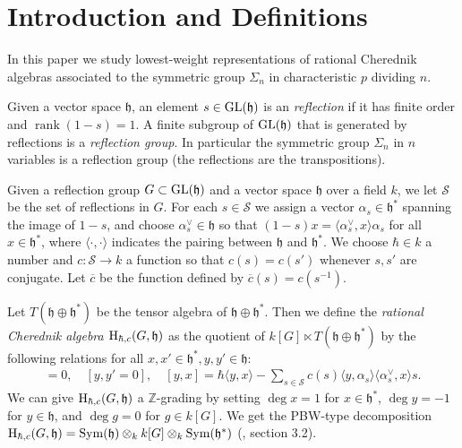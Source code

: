 \documentclass{article}
\numberwithin{equation}{section}
\newcommand{\rank}{\operatorname{rank}}
\newcommand{\h}{\mathfrak{h}}
\newcommand{\GL}{{\rm GL}}
\newcommand{\HH}{{\rm H}}
\newcommand{\Sym}{\operatorname{Sym}}
\begin{document}




\section{Introduction and Definitions}

In this paper we study lowest-weight representations of rational Cherednik algebras associated to the symmetric group $\Sigma_n$ in characteristic $p$ dividing $n$.


Given a vector space $\h$, an element $s \in \GL(\h)$ is an {\it reflection} if it has finite order and $\rank(1-s)=1$. A finite subgroup of $\GL(\h)$ that is generated by reflections is a {\it reflection group}. In particular the symmetric group $\Sigma_n$ in $n$ variables is a reflection group (the reflections are the transpositions). 

Given a reflection group $G \subset \GL(\h)$ and a vector space $\h$ over a field $k$, we let $\mathcal{S}$ be the set of reflections in $G$. For each $s \in \mathcal{S}$ we assign a vector $\alpha_s \in \h^*$ spanning the image of $1-s$, and choose $\alpha_s^\vee \in \h$ so that $(1-s)x=\langle \alpha_s^\vee,x\rangle \alpha_s$ for all $x \in \h^*$, where $\langle \cdot,\cdot\rangle$ indicates the pairing between $\h$ and $\h^*$. We choose $\hbar \in k$ a number and $c: \mathcal{S} \to k$ a function so that $c(s)=c(s')$ whenever $s,s'$ are conjugate. Let $\overline{c}$ be the function defined by $\overline{c}(s)=c(s^{-1})$. 

Let $T(\h \oplus \h^*)$ be the tensor algebra of $\h \oplus \h^*$. Then we define the {\it rational Cherednik algebra $\HH_{\hbar,c}(G,\h)$} as the quotient of $k[G] \ltimes T(\h \oplus \h^*)$ by the following relations for all $x,x' \in \h^*, y,y' \in \h$:
\begin{align*}
[x,x']=0, \quad [y,y' = 0], \quad [y,x] = \hbar\langle y,x\rangle - \sum_{s \in \mathcal{S}} c(s)\langle y,\alpha_s\rangle\langle \alpha_s^\vee,x\rangle s.
\end{align*}
We can give $\HH_{\hbar,c}(G,\h)$ a $\mathbb{Z}$-grading by setting $\deg x=1$ for $x \in \h^*$, $\deg y = -1$ for $y \in \h$, and $\deg g=0$ for $g \in k[G]$. We get the PBW-type decomposition $\HH_{\hbar,c}(G,\h)=\Sym(\h) \otimes_k k[G] \otimes_k \Sym(\h^*)$ (\cite{EM}, section 3.2). 
\end{document}
